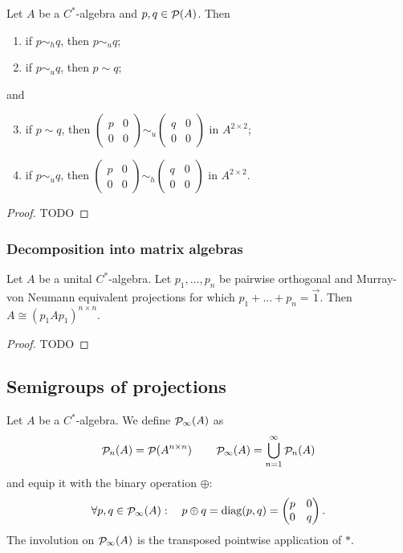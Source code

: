 \begin{proposition} \label{implicationsBeweenEquivalences}
Let $A$ be a $C^*$-algebra and $p,q\in\mathop{\mathcal{P}}\nolimits(A)$. Then
\begin{enumerate}
\item if $p\sim_h q$, then $p \sim_u q$;
\item if $p\sim_u q$, then $p \sim q$;
\end{enumerate}and
\begin{enumerate}
\setcounter{enumi}{2}
\item if $p\sim q$, then $\begin{pmatrix}
p & 0 \\ 0 & 0
\end{pmatrix} \sim_u \begin{pmatrix}
q & 0 \\ 0 & 0
\end{pmatrix}$ in $A^{2\times 2}$;
\item if $p\sim_u q$, then $\begin{pmatrix}
p & 0 \\ 0 & 0
\end{pmatrix} \sim_h \begin{pmatrix}
q & 0 \\ 0 & 0
\end{pmatrix}$ in $A^{2\times 2}$.
\end{enumerate}
\end{proposition}
\begin{proof}
TODO
\end{proof}
\subsubsection{Decomposition into matrix algebras}
\begin{proposition}
Let $A$ be a unital $C^*$-algebra. Let $p_1,\ldots ,p_n$ be pairwise orthogonal and Murray-von Neumann equivalent projections for which $p_1 + \ldots + p_n = \vec{1}$. Then $A \cong (p_1Ap_1)^{n\times n}$.
\end{proposition}
\begin{proof}
TODO
\end{proof}

\subsection{Semigroups of projections}
\begin{definition}
Let $A$ be a $C^*$-algebra. We define $\mathop{\mathcal{P}}\nolimits_\infty(A)$ as
\[ \mathop{\mathcal{P}}\nolimits_n(A) = \mathop{\mathcal{P}}\nolimits(A^{n\times n}) \qquad \mathop{\mathcal{P}}\nolimits_\infty(A) = \bigcup_{n=1}^\infty \mathop{\mathcal{P}}\nolimits_n(A) \]
and equip it with the binary operation $\oplus$:
\[ \forall p,q\in \mathop{\mathcal{P}}\nolimits_\infty(A): \quad p\oplus q = \operatorname{diag}(p,q) = \begin{pmatrix}
p & 0 \\ 0 & q
\end{pmatrix}. \]
The involution on $\mathop{\mathcal{P}}\nolimits_\infty(A)$ is the transposed pointwise application of $*$.
\end{definition}

